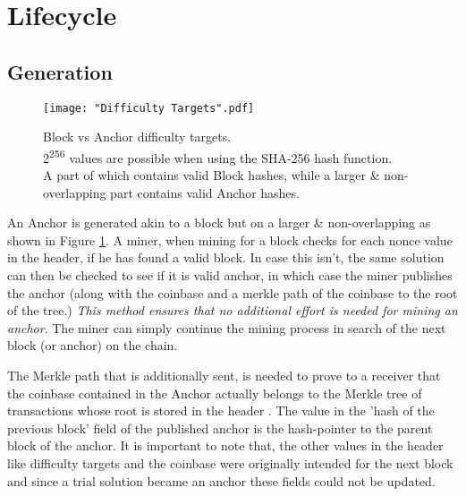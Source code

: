 
\section{Lifecycle} \label{anc-lifecycle}

\subsection{Generation} \label{anc-gen}

\begin{figure}[!htb]
    \centering
	\texttt{[image: "Difficulty Targets".pdf]}
    \caption[Block vs Anchor difficulty targets]{
        Block vs Anchor difficulty targets.\\
        \footnotesize
        2\textsuperscript{256} values are possible when using the SHA-256 hash function. \\
        A part of which contains valid Block hashes, while a larger \& non-overlapping part contains valid Anchor hashes.
    }
    \label{fig-targets}
\end{figure}

An Anchor is generated akin to a block but on a larger \& non-overlapping as shown in Figure \ref{fig-targets}.
A miner, when mining for a block checks for each nonce value in the header, if he has found a valid block.
In case this isn't, the same solution can then be checked to see if it is valid anchor, in which case the miner publishes the anchor (along with the coinbase and a merkle path of the coinbase to the root of the tree.) 
{\em This method ensures that no additional effort is needed for mining an anchor}. 
The miner can simply continue the mining process in search of the next block (or anchor) on the chain. 


The Merkle path that is additionally sent, is needed to prove to a receiver that the coinbase contained in the Anchor actually belongs to the Merkle tree of transactions whose root is stored in the header \cite{bitcoinOriginal}. 
The value in the 'hash of the previous block' field of the published anchor is the hash-pointer to the parent block of the anchor. 
It is important to note that, the other values in the header like difficulty targets and the coinbase were originally intended for the next block and since a trial solution became an anchor these fields could not be updated. 

